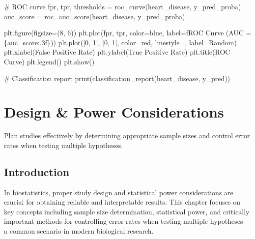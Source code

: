 \documentclass[
  11pt,
  letterpaper,
  oneside]{book}
\newenvironment{Shaded}{\begin{snugshade}}{\end{snugshade}}
\newcommand{\BuiltInTok}[1]{\textcolor[rgb]{0.00,0.23,0.31}{#1}}
\newcommand{\CommentTok}[1]{\textcolor[rgb]{0.37,0.37,0.37}{#1}}
\newcommand{\DecValTok}[1]{\textcolor[rgb]{0.68,0.00,0.00}{#1}}
\newcommand{\NormalTok}[1]{\textcolor[rgb]{0.00,0.23,0.31}{#1}}
\newcommand{\OperatorTok}[1]{\textcolor[rgb]{0.37,0.37,0.37}{#1}}
\newcommand{\SpecialCharTok}[1]{\textcolor[rgb]{0.37,0.37,0.37}{#1}}
\newcommand{\SpecialStringTok}[1]{\textcolor[rgb]{0.13,0.47,0.30}{#1}}
\newcommand{\StringTok}[1]{\textcolor[rgb]{0.13,0.47,0.30}{#1}}
\begin{document}
\begin{Shaded}
\begin{Highlighting}[]
\CommentTok{\# ROC curve}
\NormalTok{fpr, tpr, thresholds }\OperatorTok{=}\NormalTok{ roc\_curve(heart\_disease, y\_pred\_proba)}
\NormalTok{auc\_score }\OperatorTok{=}\NormalTok{ roc\_auc\_score(heart\_disease, y\_pred\_proba)}

\NormalTok{plt.figure(figsize}\OperatorTok{=}\NormalTok{(}\DecValTok{8}\NormalTok{, }\DecValTok{6}\NormalTok{))}
\NormalTok{plt.plot(fpr, tpr, color}\OperatorTok{=}\StringTok{\textquotesingle{}blue\textquotesingle{}}\NormalTok{, label}\OperatorTok{=}\SpecialStringTok{f\textquotesingle{}ROC Curve (AUC = }\SpecialCharTok{\{}\NormalTok{auc\_score}\SpecialCharTok{:.3f\}}\SpecialStringTok{)\textquotesingle{}}\NormalTok{)}
\NormalTok{plt.plot([}\DecValTok{0}\NormalTok{, }\DecValTok{1}\NormalTok{], [}\DecValTok{0}\NormalTok{, }\DecValTok{1}\NormalTok{], color}\OperatorTok{=}\StringTok{\textquotesingle{}red\textquotesingle{}}\NormalTok{, linestyle}\OperatorTok{=}\StringTok{\textquotesingle{}{-}{-}\textquotesingle{}}\NormalTok{, label}\OperatorTok{=}\StringTok{\textquotesingle{}Random\textquotesingle{}}\NormalTok{)}
\NormalTok{plt.xlabel(}\StringTok{\textquotesingle{}False Positive Rate\textquotesingle{}}\NormalTok{)}
\NormalTok{plt.ylabel(}\StringTok{\textquotesingle{}True Positive Rate\textquotesingle{}}\NormalTok{)}
\NormalTok{plt.title(}\StringTok{\textquotesingle{}ROC Curve\textquotesingle{}}\NormalTok{)}
\NormalTok{plt.legend()}
\NormalTok{plt.show()}

\CommentTok{\# Classification report}
\BuiltInTok{print}\NormalTok{(classification\_report(heart\_disease, y\_pred))}
\end{Highlighting}
\end{Shaded}


\chapter{Design \& Power
Considerations}\label{design-power-considerations}

Plan studies effectively by determining appropriate sample sizes and
control error rates when testing multiple hypotheses.

\section{Introduction}\label{introduction-1}

In biostatistics, proper study design and statistical power
considerations are crucial for obtaining reliable and interpretable
results. This chapter focuses on key concepts including sample size
determination, statistical power, and critically important methods for
controlling error rates when testing multiple hypotheses---a common
scenario in modern biological research.
\end{document}
